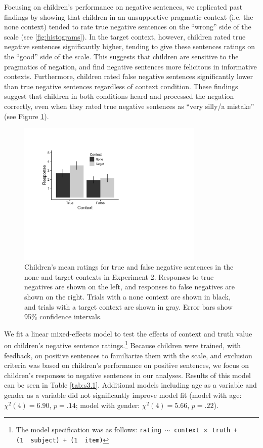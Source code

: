 \documentclass[man, noapacite]{apa2}
\begin{document}
Focusing on children's performance on negative sentences, we replicated past findings by showing that children in an unsupportive pragmatic context (i.e. the none context) tended to rate true negative sentences on the ``wrong'' side of the scale (see \ref{fig:histograms}). In the target context, however, children rated true negative sentences significantly higher, tending to give these sentences ratings on the ``good'' side of the scale. This suggests that children are sensitive to the pragmatics of negation, and find negative sentences more felicitous in informative contexts. Furthermore, children rated false negative sentences significantly lower than true negative sentences regardless of context condition. These findings suggest that children in both conditions heard and processed the negation correctly, even when they rated true negative sentences as ``very silly/a mistake'' (see Figure \ref{fig:childmeans}).

\begin{figure}
\begin{center}
\includegraphics[width=3.5in]{figures/childmeans.pdf}
\caption{\label{fig:childmeans} Children's mean ratings for true and false negative sentences in the none and target contexts in Experiment 2. Responses to true negatives are shown on the left, and responses to false negatives are shown on the right. Trials with a none context are shown in black, and trials with a target context are shown in gray. Error bars show 95\% confidence intervals.}
\end{center}
\end{figure}

We fit a linear mixed-effects model to test the effects of context and truth value on children's negative sentence ratings.\footnote{ The model specification was as follows: \texttt{rating $\sim$ context~$\times$~truth + (1~\textbar~subject) + (1~\textbar~item)}} Because children were trained, with feedback, on positive sentences to familiarize them with the scale, and exclusion criteria was based on children's performance on positive sentences, we focus on children's responses to negative sentences in our analyses. Results of this model can be seen in Table \ref{tab:s3.1}. Additional models including age as a variable and gender as a variable did not significantly improve model fit (model with age: $\chi ^{2}(4) = 6.90$, $p=.14$; model with gender: $\chi ^{2}(4) = 5.66$, $p=.22$).
\end{document}
